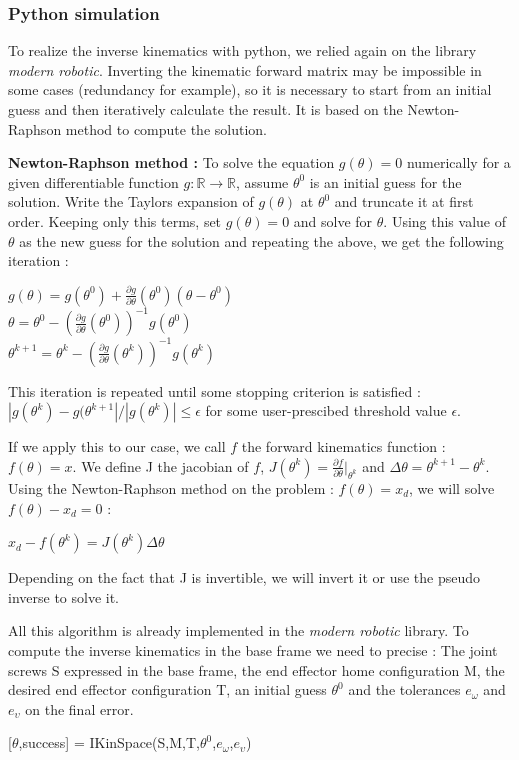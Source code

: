 \subsubsection{Python simulation}

To realize the inverse kinematics with python, we relied again on the library \textit{modern robotic}. Inverting the kinematic forward matrix may be impossible in some cases (redundancy for example), so it is necessary to start from an initial guess and then iteratively calculate the result. It is based on the Newton-Raphson method to compute the solution. 

\bigbreak
\textbf{Newton-Raphson method :} To solve the equation $g(\theta)=0$ numerically for a given differentiable function $g:\mathbb{R}\rightarrow\mathbb{R}$, assume $\theta^0$ is an initial guess for the solution. Write the Taylors expansion of $g(\theta)$ at $\theta^0$ and truncate it at first order. Keeping only this terms, set $g(\theta)=0$ and solve for $\theta$. Using this value of $\theta$ as the new guess for the solution and repeating the above, we get the following iteration : 
\begin{center}
    $g(\theta) = g(\theta^0)+\displaystyle{\frac{\partial g}{\partial\theta}(\theta^0)(\theta-\theta^0)}$\\
    $\theta = \theta^0-\displaystyle{(\frac{\partial g}{\partial\theta}(\theta^0))^{-1}g(\theta^0)}$\\
    $\theta^{k+1} = \theta^k-\displaystyle{(\frac{\partial g}{\partial\theta}(\theta^k))^{-1}g(\theta^k)}$
\end{center}
 This iteration is repeated until some stopping criterion is satisfied : $|g(\theta^k)-g(\theta^{k+1}|/|g(\theta^k)|\leq\epsilon$ for some user-prescibed threshold value $\epsilon$.
 
 \bigbreak
 If we apply this to our case, we call $f$ the forward kinematics function : $f(\theta) = x$. We define J the jacobian of $f$, $J(\theta^k)= \displaystyle{\frac{\partial f}{\partial\theta}|_{\theta^k}}$ and $\Delta\theta = \theta^{k+1}-\theta^k$. Using the Newton-Raphson method on the problem : $f(\theta)=x_d$, we will solve $f(\theta)-x_d=0$ :
 \begin{center}
     $x_d-f(\theta^k)=J(\theta^k)\Delta\theta$
 \end{center}
 Depending on the fact that J is invertible, we will invert it or use the pseudo inverse to solve it. 
 
 \bigbreak
 All this algorithm is already implemented in the \textit{modern robotic} library. To compute the inverse kinematics in the base frame we need to precise : The joint screws S expressed in the base frame, the end effector home configuration M, the desired end effector configuration T, an initial guess $\theta^0$ and the tolerances $e_\omega$ and $e_\upsilon$ on the final error.
 \begin{center}
     [$\theta$,success] = IKinSpace(S,M,T,$\theta^0$,$e_\omega$,$e_\upsilon$)
 \end{center}
 
